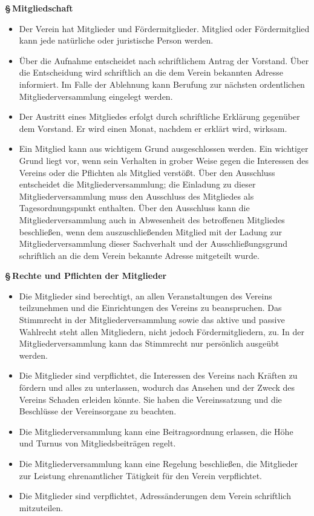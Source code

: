 \documentclass[11pt]{article}
\def\items#1{{%
  \itcounter0%
  \begin{itemize}
  #1
  \end{itemize}
}}
\let\it\item%
\def\item{
  \advance\itcounter1%
  \it[(\the\itcounter)]
}
\def\paragraf#1{
  \advance\itcounter1%
  \par\medskip
  {\large\bfseries \S\,\the\itcounter\quad#1}
  \par\smallskip
}
\begin{document}
\paragraf{Mitgliedschaft}

\items{
   \item Der Verein hat Mitglieder und F{\"o}rdermitglieder. Mitglied oder
   F{\"o}rdermitglied kann jede nat\"urliche oder juristische Person werden.
   \item {\"U}ber die Aufnahme entscheidet nach schriftlichem Antrag der Vorstand.
       {\"U}ber die Entscheidung wird schriftlich an die dem Verein bekannten Adresse informiert.
       Im Falle der Ablehnung kann Berufung zur n{\"a}chsten
       ordentlichen Mitgliederversammlung eingelegt werden.
   \item Der Austritt eines Mitgliedes erfolgt durch schriftliche Erkl{\"a}rung gegen{\"u}ber
       dem Vorstand. Er wird einen Monat, nachdem er erkl{\"a}rt wird, wirksam.
   \item Ein Mitglied kann aus wichtigem Grund ausgeschlossen werden. Ein
       wichtiger Grund liegt vor, wenn sein Verhalten in grober Weise gegen die
       Interessen des Vereins oder die Pflichten als Mitglied verst{\"o}{\ss}t.
       {\"U}ber den Ausschluss entscheidet die Mitgliederversammlung;
       die Einladung zu dieser Mitgliederversammlung muss den Ausschluss des
       Mitgliedes als Tagesordnungspunkt enthalten.
       {\"U}ber den Ausschluss kann die Mitgliederversammlung auch in
       Abwesenheit des betroffenen Mitgliedes beschlie{\ss}en, wenn
       dem auszuschlie{\ss}enden Mitglied mit der Ladung zur Mitgliederversammlung
       dieser Sachverhalt und der Ausschlie{\ss}ungsgrund schriftlich an die dem Verein
       bekannte Adresse mitgeteilt wurde.
}

\paragraf{Rechte und Pflichten der Mitglieder}

\items{
   \item Die Mitglieder sind berechtigt, an allen Veranstaltungen des Vereins
       teilzunehmen und die Einrichtungen des Vereins zu beanspruchen. Das
       Stimmrecht in der Mitgliederversammlung sowie das aktive und passive
       Wahlrecht steht allen Mitgliedern, nicht jedoch F{\"o}rdermitgliedern, zu.
       In der Mitgliederversammlung kann das Stimmrecht nur pers{\"o}nlich ausge{\"u}bt werden.
   \item Die Mitglieder sind verpflichtet, die Interessen des Vereins nach Kr{\"a}ften zu
       f{\"o}rdern und alles zu unterlassen, wodurch das Ansehen und der Zweck des
       Vereins Schaden erleiden k{\"o}nnte. Sie haben die Vereinssatzung und die
       Beschl{\"u}sse der Vereinsorgane zu beachten.
   \item Die Mitgliederversammlung kann eine Beitragsordnung erlassen, die H{\"o}he und
       Turnus von Mitgliedsbeitr{\"a}gen regelt.
   \item Die Mitgliederversammlung kann eine Regelung beschlie{\ss}en, die Mitglieder
       zur Leistung ehrenamtlicher T{\"a}tigkeit f{\"u}r den Verein verpflichtet.
   \item Die Mitglieder sind verpflichtet, Adress{\"a}nderungen dem Verein schriftlich mitzuteilen.
}
\end{document}
